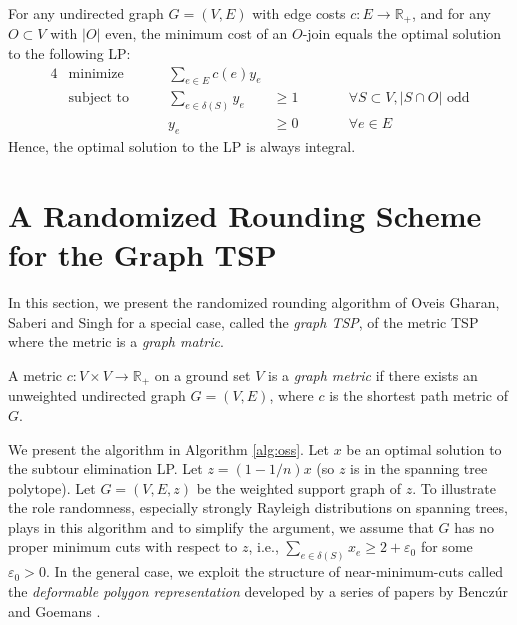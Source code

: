 \documentclass[letterpaper, reqno,12pt]{article}
\newcommand{\RR}{\mathbb{R}}
\begin{document}
\begin{corollary} \label{cor:min-o-join}
  For any undirected graph $G = (V, E)$ with edge costs $c : E \to \RR_+$, and for any $O \subset V$ with $|O|$ even, the minimum cost of an $O$-join equals the optimal solution to the following LP:
  \begin{alignat*}{4}
    & \text{minimize} \qquad & \sum_{e \in E} c(e) y_e \\
    & \text{subject to} \qquad & \sum_{e \in \delta(S)} y_e &\geq 1 && \qquad \forall S \subset V, |S \cap O| \text{ odd} \\
    & & y_e &\geq 0 && \qquad \forall e \in E
  \end{alignat*}
  Hence, the optimal solution to the LP is always integral.
\end{corollary}

\section{A Randomized Rounding Scheme for the Graph TSP}

In this section, we present the randomized rounding algorithm of Oveis Gharan, Saberi and Singh \cite{gharan2011randomized} for a special case, called the \emph{graph TSP}, of the metric TSP where the metric is a \emph{graph matric}.

\begin{definition}
  A metric $c : V \times V \to \RR_+$ on a ground set $V$ is a \emph{graph metric} if there exists an unweighted undirected graph $G = (V, E)$, where $c$ is the shortest path metric of $G$.
\end{definition}

We present the algorithm in Algorithm \ref{alg:oss}. Let $x$ be an optimal solution to the subtour elimination LP. Let $z = (1 - 1/n) x$ (so $z$ is in the spanning tree polytope). Let $G = (V, E, z)$ be the weighted support graph of $z$. To illustrate the role randomness, especially strongly Rayleigh distributions on spanning trees, plays in this algorithm and to simplify the argument, we assume that $G$ has no proper minimum cuts with respect to $z$, i.e., $\sum_{e \in \delta(S)} x_e \geq 2 + \varepsilon_0$ for some $\varepsilon_0 > 0$. In the general case, we exploit the structure of near-minimum-cuts called the \emph{deformable polygon representation} developed by a series of papers by Bencz\'ur and Goemans \cite{benczur1995representation, benczur1995structure, benczur1997cut, benczur2008deformable}.
\end{document}
